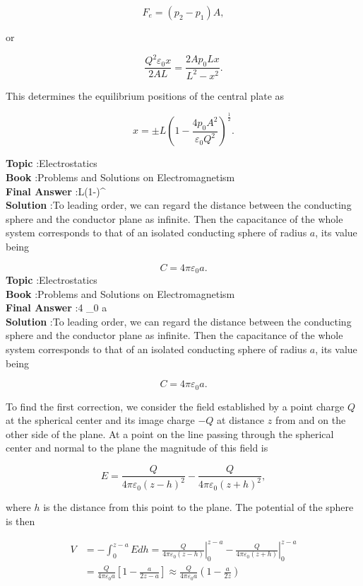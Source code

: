 \documentclass[10pt]{article}
\begin{document}
$$
F_{e}=\left(p_{2}-p_{1}\right) A,
$$

or

$$
\frac{Q^{2} \varepsilon_{0} x}{2 A L}=\frac{2 A p_{0} L x}{L^{2}-x^{2}} .
$$

This determines the equilibrium positions of the central plate as

$$
x=\pm L\left(1-\frac{4 p_{0} A^{2}}{\varepsilon_{0} Q^{2}}\right)^{\frac{1}{2}} .
$$


\textbf{Topic} :Electrostatics\\
\textbf{Book} :Problems and Solutions on Electromagnetism\\
\textbf{Final Answer} :\pm L\left(1-\right)^{}\\


\textbf{Solution} :To leading order, we can regard the distance between the conducting sphere and the conductor plane as infinite. Then the capacitance of the whole system corresponds to that of an isolated conducting sphere of radius $a$, its value being

$$
C=4 \pi \varepsilon_{0} a .
$$
\textbf{Topic} :Electrostatics\\
\textbf{Book} :Problems and Solutions on Electromagnetism\\
\textbf{Final Answer} :4 \pi \varepsilon_{0} a\\


\textbf{Solution} :To leading order, we can regard the distance between the conducting sphere and the conductor plane as infinite. Then the capacitance of the whole system corresponds to that of an isolated conducting sphere of radius $a$, its value being

$$
C=4 \pi \varepsilon_{0} a .
$$

 To find the first correction, we consider the field established by a point charge $Q$ at the spherical center and its image charge $-Q$ at distance $z$ from and on the other side of the plane. At a point on the line passing through the spherical center and normal to the plane the magnitude of this field is

$$
E=\frac{Q}{4 \pi \varepsilon_{0}(z-h)^{2}}-\frac{Q}{4 \pi \varepsilon_{0}(z+h)^{2}},
$$

where $h$ is the distance from this point to the plane. The potential of the sphere is then

$$
\begin{aligned}
V &=-\int_{0}^{z-a} E d h=\left.\frac{Q}{4 \pi \varepsilon_{0}(z-h)}\right|_{0} ^{z-a}-\left.\frac{Q}{4 \pi \varepsilon_{0}(z+h)}\right|_{0} ^{z-a} \\
&=\frac{Q}{4 \pi \varepsilon_{0} a}\left[1-\frac{a}{2 z-a}\right] \approx \frac{Q}{4 \pi \varepsilon_{0} a}\left(1-\frac{a}{2 z}\right)
\end{aligned}
$$
\end{document}
